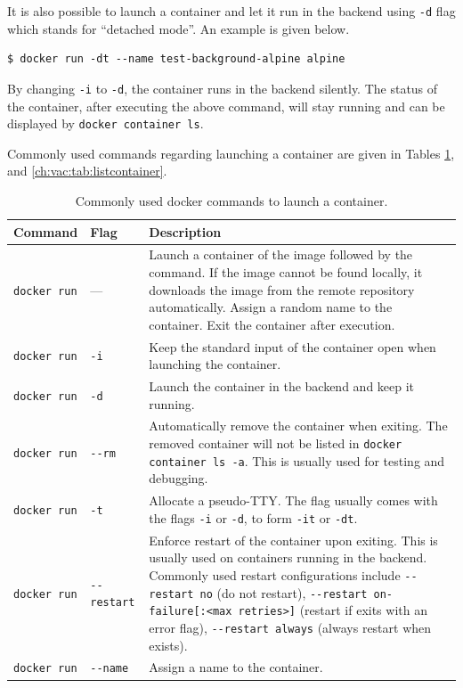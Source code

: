 It is also possible to launch a container and let it run in the backend using \verb|-d| flag which stands for ``detached mode''. An example is given below.
\begin{lstlisting}
$ docker run -dt --name test-background-alpine alpine
\end{lstlisting}
By changing \verb|-i| to \verb|-d|, the container runs in the backend silently. The status of the container, after executing the above command, will stay running and can be displayed by \verb|docker container ls|.

Commonly used commands regarding launching a container are given in Tables \ref{ch:vac:tab:launchcontainer}, and \ref{ch:vac:tab:listcontainer}.

\begin{table}
	\centering \caption{Commonly used docker commands to launch a container.}\label{ch:vac:tab:launchcontainer}
	\begin{tabularx}{\textwidth}{llX}
		\hline
		Command & Flag & Description \\ \hline
		\verb|docker run| & --- & Launch a container of the image followed by the command. If the image cannot be found locally, it downloads the image from the remote repository automatically. Assign a random name to the container. Exit the container after execution. \\ \hdashline
        \verb|docker run| & \verb|-i| & Keep the standard input of the container open when launching the container. \\ \hdashline
        \verb|docker run| & \verb|-d| & Launch the container in the backend and keep it running. \\ \hdashline
        \verb|docker run| & \verb|--rm| & Automatically remove the container when exiting. The removed container will not be listed in \verb|docker container ls -a|. This is usually used for testing and debugging. \\ \hdashline
        \verb|docker run| & \verb|-t| & Allocate a pseudo-TTY. The flag usually comes with the flags \verb|-i| or \verb|-d|, to form \verb|-it| or \verb|-dt|. \\ \hdashline
        \verb|docker run| & \verb|--restart| & Enforce restart of the container upon exiting. This is usually used on containers running in the backend. Commonly used restart configurations include \verb|--restart no| (do not restart), \verb|--restart on-failure[:<max retries>]| (restart if exits with an error flag), \verb|--restart always| (always restart when exists). \\ \hdashline
        \verb|docker run| & \verb|--name| & Assign a name to the container. \\
		\hline
	\end{tabularx}
\end{table}

